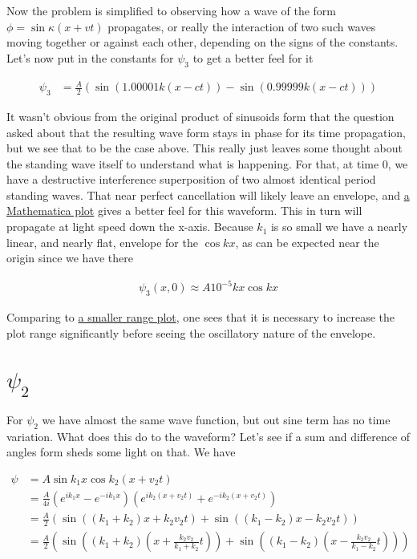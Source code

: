 Now the problem is simplified to observing how a wave of the form $\phi = \sin \kappa (x + v t)$ propagates, or really the interaction of two such waves moving together or against each other, depending on the signs of the constants.  Let's now put in the constants for $\psi_3$ to get a better feel for it

\begin{align*}
\psi_3
&= \frac{A}{2} \left( 
\sin \left( 1.00001 k \left(x - c t\right) \right)
-\sin \left( 0.99999 k \left(x - c t\right) \right)
\right)
\end{align*}

It wasn't obvious from the original product of sinusoids form that the question asked about that the resulting wave form stays in phase for its time propagation, but we see that to be the case above.  This really just leaves some thought about the standing wave itself to understand what is happening.  For that, at time 0, we have a destructive interference superposition of two almost identical period standing waves.  That near perfect cancellation will likely leave an envelope, and \href{http://www.wolframalpha.com/input/?i=Plot[Cos[x]+Sin[0.00001+x],+{x,+-317000,+317000}]}{a Mathematica plot} gives a better feel for this waveform.  This in turn will propagate at light speed down the x-axis.  Because $k_1$ is so small we have a nearly linear, and nearly flat, envelope for the $\cos k x$, as can be expected near the origin since we have there

\begin{align*}
\psi_3(x, 0) \approx A 10^{-5} k x \cos k x
\end{align*}

Comparing to \href{http://www.wolframalpha.com/input/?i=Plot[Cos[x]+Sin[0.00001+x],+{x,+-317,+317}]}{a smaller range plot}, one sees that it is necessary to increase the plot range significantly before seeing the oscillatory nature of the envelope.

\section{$\psi_2$}

For $\psi_2$ we have almost the same wave function, but out sine term has no time variation.  What does this do to the waveform?  Let's see if a sum and difference of angles form sheds some light on that.  We have

\begin{align*}
\psi 
&= A \sin k_1 x \cos k_2 ( x + v_2 t) \\
&= \frac{A}{4i} \left( e^{ i k_1 x } - e^{ -i k_1 x } \right) \left( e^{ i k_2 ( x + v_2 t)} + e^{ -i k_2 ( x + v_2 t)} \right) \\
&= \frac{A}{2} \left( 
\sin ((k_1 + k_2) x + k_2 v_2 t) 
+ \sin ((k_1 - k_2) x - k_2 v_2 t) \right) \\
&= \frac{A}{2} \left( 
\sin \left( (k_1 + k_2) \left(x + \frac{k_2 v_2 }{k_1 + k_2} t\right) \right)
+\sin \left( (k_1 - k_2) \left(x - \frac{k_2 v_2 }{k_1 - k_2} t\right) \right)
\right)
\end{align*}

